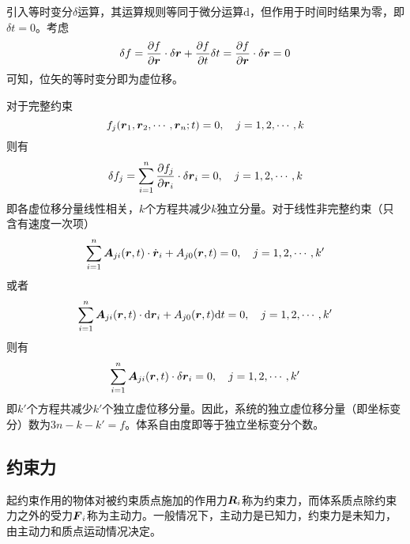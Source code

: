 引入等时变分$\delta$运算，其运算规则等同于微分运算$\mathrm{d}$，但作用于时间时结果为零，即$\delta t=0$。考虑
\begin{equation*}
	\delta f = \frac{\partial f}{\partial \boldsymbol{r}} \cdot \delta \boldsymbol{r} + \frac{\partial f}{\partial t} \delta t = \frac{\partial f}{\partial \boldsymbol{r}} \cdot \delta \boldsymbol{r} = 0
\end{equation*}
可知，位矢的等时变分即为虚位移。

对于完整约束
\begin{equation*}
	f_j(\boldsymbol{r}_1,\boldsymbol{r}_2,\cdots,\boldsymbol{r}_n;t) = 0,\quad j = 1,2,\cdots,k
\end{equation*}
则有
\begin{equation*}
	\delta f_j = \sum_{i=1}^n \frac{\partial f_j}{\partial \boldsymbol{r}_i} \cdot \delta \boldsymbol{r}_i = 0,\quad j = 1,2,\cdots,k
\end{equation*}
即各虚位移分量线性相关，$k$个方程共减少$k$独立分量。对于线性非完整约束（只含有速度一次项）
\begin{equation*}
	\sum_{i=1}^n \boldsymbol{A}_{ji}(\boldsymbol{r},t) \cdot \dot{\boldsymbol{r}}_i + A_{j0}(\boldsymbol{r},t) = 0,\quad j=1,2,\cdots,k'
\end{equation*}
或者
\begin{equation*}
	\sum_{i=1}^n \boldsymbol{A}_{ji}(\boldsymbol{r},t) \cdot \mathrm{d} \boldsymbol{r}_i + A_{j0}(\boldsymbol{r},t) \mathrm{d}t = 0,\quad j=1,2,\cdots,k'
\end{equation*}
则有
\begin{equation*}
	\sum_{i=1}^n \boldsymbol{A}_{ji}(\boldsymbol{r},t) \cdot \delta \boldsymbol{r}_i = 0,\quad j=1,2,\cdots,k'
\end{equation*}
即$k'$个方程共减少$k'$个独立虚位移分量。因此，系统的独立虚位移分量（即坐标变分）数为$3n-k-k'=f$。体系自由度即等于独立坐标变分个数。

\subsection{约束力}

起约束作用的物体对被约束质点施加的作用力$\boldsymbol{R}_i$称为{\heiti 约束力}，而体系质点除约束力之外的受力$\boldsymbol{F}_i$称为{\heiti 主动力}。一般情况下，主动力是已知力，约束力是未知力，由主动力和质点运动情况决定。

